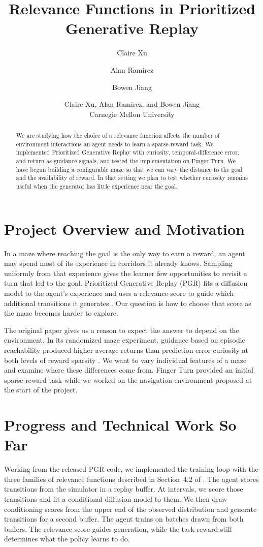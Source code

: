 \documentclass[11pt,letterpaper]{cmu}
\title{Relevance Functions in Prioritized Generative Replay}
\author[1]{Claire Xu}
\author[1]{Alan Ramirez}
\author[1]{Bowen Jiang}
\affil[1]{Carnegie Mellon University}
\author{Claire Xu, Alan Ramirez, and Bowen Jiang\\Carnegie Mellon University}
\date{}
\newcommand{\reportabstract}{%
We are studying how the choice of a relevance function affects the number of environment interactions an agent needs to learn a sparse-reward task. We implemented Prioritized Generative Replay with curiosity, temporal-difference error, and return as guidance signals, and tested the implementation on Finger Turn. We have begun building a configurable maze so that we can vary the distance to the goal and the availability of reward. In that setting we plan to test whether curiosity remains useful when the generator has little experience near the goal.}
\begin{document}
\maketitle
\ifcourseclass\else
  \begin{abstract}\reportabstract\end{abstract}
\fi

\section{Project Overview and Motivation}
In a maze where reaching the goal is the only way to earn a reward, an agent may spend most of its experience in corridors it already knows. Sampling uniformly from that experience gives the learner few opportunities to revisit a turn that led to the goal. Prioritized Generative Replay (PGR) fits a diffusion model to the agent's experience and uses a relevance score to guide which additional transitions it generates \citep{wang2025pgr}. Our question is how to choose that score as the maze becomes harder to explore.

The original paper gives us a reason to expect the answer to depend on the environment. In its randomized maze experiment, guidance based on episodic reachability produced higher average returns than prediction-error curiosity at both levels of reward sparsity \citep[Appendix~A.2]{wang2025pgr}. We want to vary individual features of a maze and examine where these differences come from. Finger Turn provided an initial sparse-reward task while we worked on the navigation environment proposed at the start of the project.

\section{Progress and Technical Work So Far}
Working from the released PGR code, we implemented the training loop with the three families of relevance functions described in Section~4.2 of \citet{wang2025pgr}. The agent stores transitions from the simulator in a replay buffer. At intervals, we score those transitions and fit a conditional diffusion model to them. We then draw conditioning scores from the upper end of the observed distribution and generate transitions for a second buffer. The agent trains on batches drawn from both buffers. The relevance score guides generation, while the task reward still determines what the policy learns to do.
\end{document}
